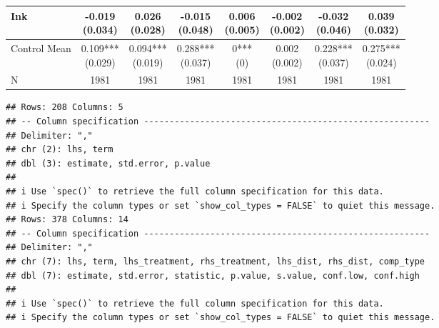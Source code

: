 \documentclass[
]{article}
\begin{document}
\begin{table}
{\begin{tabular}[t]{lccccccc}
\hspace{1em}Ink & \makecell[c]{-0.019\\(0.034)} & \makecell[c]{0.026\\(0.028)} & \makecell[c]{-0.015\\(0.048)} & \makecell[c]{0.006\\(0.005)} & \makecell[c]{-0.002\\(0.002)} & \makecell[c]{-0.032\\(0.046)} & \makecell[c]{0.039\\(0.032)}\\
\midrule
\hspace{1em}Control Mean & \makecell[c]{0.109***\\(0.029)} & \makecell[c]{0.094***\\(0.019)} & \makecell[c]{0.288***\\(0.037)} & \makecell[c]{0***\\(0)} & \makecell[c]{0.002\\(0.002)} & \makecell[c]{0.228***\\(0.037)} & \makecell[c]{0.275***\\(0.024)}\\
\hspace{1em}N & 1981 & 1981 & 1981 & 1981 & 1981 & 1981 & 1981\\
\bottomrule
\end{tabular}}
\end{table}

\begin{verbatim}
## Rows: 208 Columns: 5
## -- Column specification --------------------------------------------------------
## Delimiter: ","
## chr (2): lhs, term
## dbl (3): estimate, std.error, p.value
## 
## i Use `spec()` to retrieve the full column specification for this data.
## i Specify the column types or set `show_col_types = FALSE` to quiet this message.
## Rows: 378 Columns: 14
## -- Column specification --------------------------------------------------------
## Delimiter: ","
## chr (7): lhs, term, lhs_treatment, rhs_treatment, lhs_dist, rhs_dist, comp_type
## dbl (7): estimate, std.error, statistic, p.value, s.value, conf.low, conf.high
## 
## i Use `spec()` to retrieve the full column specification for this data.
## i Specify the column types or set `show_col_types = FALSE` to quiet this message.
\end{verbatim}
\end{document}
